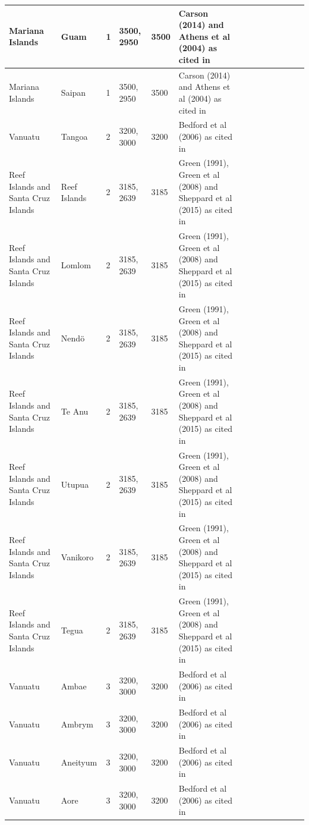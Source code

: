 \documentclass[draft,10pt]{article} %
\begin{document}
\begin{landscape}
\begin{longtable}{| p{3cm}| p{4cm}| p{4cm}|p{2cm}|p{2cm}|p{2cm}|p{2cm}|p{2cm}|p{2cm}|p{2cm}|p{2cm}|p{2cm}|p{2cm}|p{2cm}}
 Mariana Islands & Guam & 1 & 3500, 2950 & 3500 & Carson (2014) and Athens et al (2004) as cited in \citet{rieth_cochrane_2018} &   \\ \hline
 Mariana Islands & Saipan & 1 & 3500, 2950 & 3500 & Carson (2014) and Athens et al (2004) as cited in \citet{rieth_cochrane_2018} &   \\ \hline
 Vanuatu & Tangoa & 2 & 3200, 3000 & 3200 & Bedford et al (2006) as cited in \citet{rieth_cochrane_2018} &   \\ \hline
 Reef Islands and Santa Cruz Islands & Reef Islands & 2 & 3185, 2639 & 3185 & Green (1991), Green et al (2008) and Sheppard et al (2015) as cited in \citet{rieth_cochrane_2018} &   \\ \hline
 Reef Islands and Santa Cruz Islands & Lomlom & 2 & 3185, 2639 & 3185 & Green (1991), Green et al (2008) and Sheppard et al (2015) as cited in \citet{rieth_cochrane_2018} &   \\ \hline
 Reef Islands and Santa Cruz Islands & Nendö & 2 & 3185, 2639 & 3185 & Green (1991), Green et al (2008) and Sheppard et al (2015) as cited in \citet{rieth_cochrane_2018} &   \\ \hline
 Reef Islands and Santa Cruz Islands & Te Anu & 2 & 3185, 2639 & 3185 & Green (1991), Green et al (2008) and Sheppard et al (2015) as cited in \citet{rieth_cochrane_2018} &   \\ \hline
 Reef Islands and Santa Cruz Islands & Utupua & 2 & 3185, 2639 & 3185 & Green (1991), Green et al (2008) and Sheppard et al (2015) as cited in \citet{rieth_cochrane_2018} &   \\ \hline
 Reef Islands and Santa Cruz Islands & Vanikoro & 2 & 3185, 2639 & 3185 & Green (1991), Green et al (2008) and Sheppard et al (2015) as cited in \citet{rieth_cochrane_2018} &   \\ \hline
 Reef Islands and Santa Cruz Islands & Tegua & 2 & 3185, 2639 & 3185 & Green (1991), Green et al (2008) and Sheppard et al (2015) as cited in \citet{rieth_cochrane_2018} &   \\ \hline
 Vanuatu & Ambae & 3 & 3200, 3000 & 3200 & Bedford et al (2006) as cited in \citet{rieth_cochrane_2018} &   \\ \hline
 Vanuatu & Ambrym & 3 & 3200, 3000 & 3200 & Bedford et al (2006) as cited in \citet{rieth_cochrane_2018} &   \\ \hline
 Vanuatu & Aneityum & 3 & 3200, 3000 & 3200 & Bedford et al (2006) as cited in \citet{rieth_cochrane_2018} &   \\ \hline
 Vanuatu & Aore & 3 & 3200, 3000 & 3200 & Bedford et al (2006) as cited in \citet{rieth_cochrane_2018} &   \\ \hline

\end{longtable}
\end{landscape}
\end{document}
